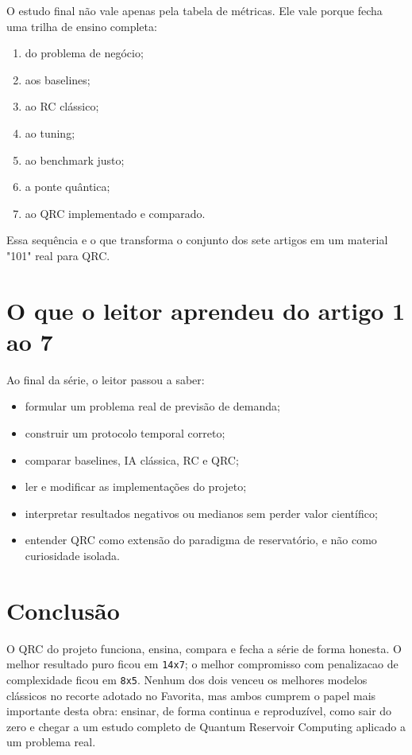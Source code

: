 \documentclass[12pt]{article}
\providecommand{\tightlist}{%
          \setlength{\itemsep}{0pt}\setlength{\parskip}{0pt}}
\begin{document}
O estudo final não vale apenas pela tabela de métricas. Ele vale porque fecha uma trilha de ensino completa:

\begin{enumerate}
\def\labelenumi{\arabic{enumi}.}
\tightlist
\item
  do problema de negócio;
\item
  aos baselines;
\item
  ao RC clássico;
\item
  ao tuning;
\item
  ao benchmark justo;
\item
  a ponte quântica;
\item
  ao QRC implementado e comparado.
\end{enumerate}

Essa sequência e o que transforma o conjunto dos sete artigos em um material "101" real para QRC.

\section{O que o leitor aprendeu do artigo 1 ao 7}\label{10-o-que-o-leitor-aprendeu-do-artigo-1-ao-7}

Ao final da série, o leitor passou a saber:

\begin{itemize}
\tightlist
\item
  formular um problema real de previsão de demanda;
\item
  construir um protocolo temporal correto;
\item
  comparar baselines, IA clássica, RC e QRC;
\item
  ler e modificar as implementações do projeto;
\item
  interpretar resultados negativos ou medianos sem perder valor científico;
\item
  entender QRC como extensão do paradigma de reservatório, e não como curiosidade isolada.
\end{itemize}

\section{Conclusão}\label{11-conclusuxe3o}

O QRC do projeto funciona, ensina, compara e fecha a série de forma honesta. O melhor resultado puro ficou em \texttt{14x7}; o melhor compromisso com penalizacao de complexidade ficou em \texttt{8x5}. Nenhum dos dois venceu os melhores modelos clássicos no recorte adotado no Favorita, mas ambos cumprem o papel mais importante desta obra: ensinar, de forma continua e reproduzível, como sair do zero e chegar a um estudo completo de Quantum Reservoir Computing aplicado a um problema real.
\end{document}
